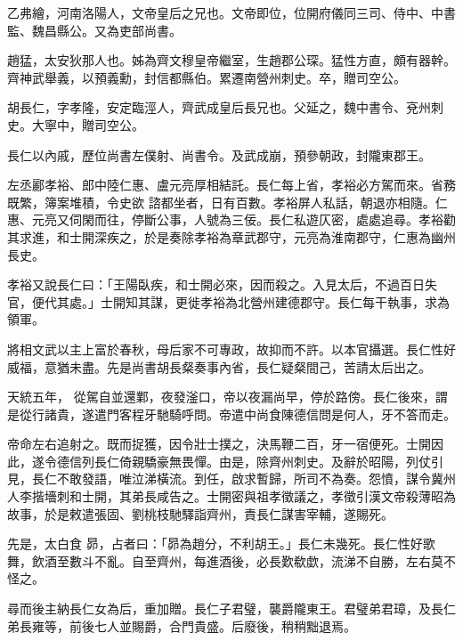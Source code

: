 \begin{pinyinscope}
 乙弗繪，河南洛陽人，文帝皇后之兄也。文帝即位，位開府儀同三司、侍中、中書監、魏昌縣公。又為吏部尚書。



 趙猛，太安狄那人也。姊為齊文穆皇帝繼室，生趙郡公琛。猛性方直，頗有器幹。齊神武舉義，以預義勳，封信都縣伯。累遷南營州刺史。卒，贈司空公。



 胡長仁，字孝隆，安定臨涇人，齊武成皇后長兄也。父延之，魏中書令、兗州刺史。大寧中，贈司空公。



 長仁以內戚，歷位尚書左僕射、尚書令。及武成崩，預參朝政，封隴東郡王。



 左丞酈孝裕、郎中陸仁惠、盧元亮厚相結託。長仁每上省，孝裕必方駕而來。省務既繁，簿案堆積，令史欲
 諮都坐者，日有百數。孝裕屏人私話，朝退亦相隨。仁惠、元亮又伺閑而往，停斷公事，人號為三佞。長仁私遊仄密，處處追尋。孝裕勸其求進，和士開深疾之，於是奏除孝裕為章武郡守，元亮為淮南郡守，仁惠為幽州長史。



 孝裕又說長仁曰：「王陽臥疾，和士開必來，因而殺之。入見太后，不過百日失官，便代其處。」士開知其謀，更徙孝裕為北營州建德郡守。長仁每干執事，求為領軍。



 將相文武以主上富於春秋，母后家不可專政，故抑而不許。以本官攝選。長仁性好威福，意猶未盡。先是尚書胡長粲奏事內省，長仁疑粲間己，苦請太后出之。



 天統五年，
 從駕自並還鄴，夜發滏口，帝以夜漏尚早，停於路傍。長仁後來，謂是從行諸貴，遂遣門客程牙馳騎呼問。帝遣中尚食陳德信問是何人，牙不答而走。



 帝命左右追射之。既而捉獲，因令壯士撲之，決馬鞭二百，牙一宿便死。士開因此，遂令德信列長仁倚親驕豪無畏憚。由是，除齊州刺史。及辭於昭陽，列仗引見，長仁不敢發語，唯泣涕橫流。到任，啟求暫歸，所司不為奏。怨憤，謀令冀州人李揩墻刺和士開，其弟長咸告之。士開密與祖孝徵議之，孝徵引漢文帝殺薄昭為故事，於是敕遣張固、劉桃枝馳驛詣齊州，責長仁謀害宰輔，遂賜死。



 先是，太白食
 昴，占者曰：「昴為趙分，不利胡王。」長仁未幾死。長仁性好歌舞，飲酒至數斗不亂。自至齊州，每進酒後，必長歎欷歔，流涕不自勝，左右莫不怪之。



 尋而後主納長仁女為后，重加贈。長仁子君璧，襲爵隴東王。君璧弟君璋，及長仁弟長雍等，前後七人並賜爵，合門貴盛。后廢後，稍稍黜退焉。




\end{pinyinscope}
